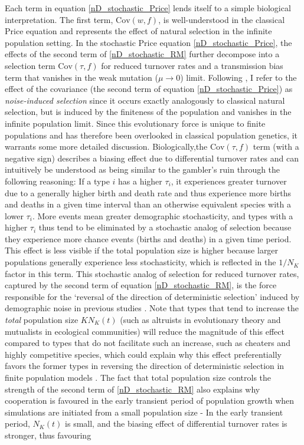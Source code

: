 Each term in equation \eqref{nD_stochastic_Price} lends itself to a simple biological interpretation. The first term, $\textrm{Cov}(w,f)$, is well-understood in the classical Price equation and represents the effect of natural selection in the infinite population setting. In the stochastic Price equation \eqref{nD_stochastic_Price}, the effects of the second term of 
\eqref{nD_stochastic_RM} further decompose into a selection term $\textrm{Cov}(\tau,f)$ for reduced turnover rates and a transmission bias term that vanishes in the weak mutation ($\mu \to 0$) limit. Following \cite{week_white_2021}, I refer to the effect of the covariance (the second term of equation \eqref{nD_stochastic_Price}) as \emph{noise-induced selection} since it occurs exactly analogously to classical natural selection, but is induced by the finiteness of the population and vanishes in the infinite population limit. Since this evolutionary force is unique to finite populations and has therefore been overlooked in classical population genetics, it warrants some more detailed discussion. Biologically,the $\textrm{Cov}(\tau,f)$ term (with a negative sign) describes a biasing effect due to differential turnover rates and can intuitively be understood as being similar to the gambler's ruin through the following reasoning: If a type $i$ has a higher $\tau_i$, it experiences greater turnover due to a generally higher birth and death rate and thus experience more births and deaths in a given time interval than an otherwise equivalent species with a lower $\tau_i$. More events mean greater demographic stochasticity, and types with a higher $\tau_i$ thus tend to be eliminated by a stochastic analog of selection because they experience more chance events (births and deaths) in a given time period. This effect is less visible if the total population size is higher because larger populations generally experience less stochasticity, which is reflected in the $1/N_K$ factor in this term. This stochastic analog of selection for reduced turnover rates, captured by the second term of equation \eqref{nD_stochastic_RM}, is the force responsible for the `reversal of the direction of deterministic selection' induced by demographic noise in previous studies \citep{houchmandzadeh_selection_2012, houchmandzadeh_fluctuation_2015, constable_demographic_2016, mcleod_social_2019}. Note that types that tend to increase the \emph{total} population size $KN_K(t)$ (such as altruists in evolutionary theory and mutualists in ecological communities) will reduce the magnitude of this effect compared to types that do not facilitate such an increase, such as cheaters and highly competitive species, which could explain why this effect preferentially favors the former types in reversing the direction of deterministic selection in finite population models \citep{houchmandzadeh_fluctuation_2015, mcleod_social_2019}. The fact that total population size controls the strength of the second term of \eqref{nD_stochastic_RM} also explains why cooperation is favoured in the early transient period of population growth \citep{melbinger_evolutionary_2010} when simulations are initiated from a small population size - In the early transient period, $N_K(t)$ is small, and the biasing effect of differential turnover rates is stronger, thus favouring 